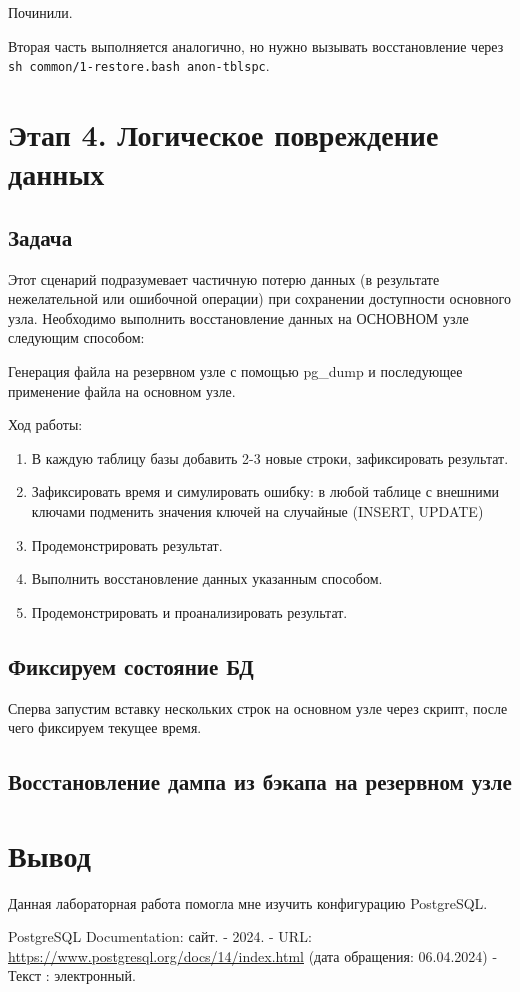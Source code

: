 \documentclass{article}
\begin{document}
Починили.

Вторая часть выполняется аналогично, но нужно вызывать восстановление через \texttt{sh common/1-restore.bash anon-tblspc}.

\section{Этап 4. Логическое повреждение данных}

\subsection{Задача}

Этот сценарий подразумевает частичную потерю данных (в результате нежелательной или ошибочной операции) при сохранении доступности основного узла. Необходимо выполнить восстановление данных на ОСНОВНОМ узле следующим способом:

Генерация файла на резервном узле с помощью pg\_dump и последующее применение файла на основном узле.

Ход работы:

\begin{enumerate}
    \item В каждую таблицу базы добавить 2-3 новые строки, зафиксировать результат.
    \item Зафиксировать время и симулировать ошибку: в любой таблице с внешними ключами подменить значения ключей на случайные (INSERT, UPDATE)
    \item Продемонстрировать результат.
    \item Выполнить восстановление данных указанным способом.
    \item Продемонстрировать и проанализировать результат.
\end{enumerate}

\subsection{Фиксируем состояние БД}

Сперва запустим вставку нескольких строк на основном узле через скрипт, после чего фиксируем текущее время.



\subsection{Восстановление дампа из бэкапа на резервном узле}

\section{Вывод}

Данная лабораторная работа помогла мне изучить конфигурацию PostgreSQL.

\begin{thebibliography}{99}
    PostgreSQL Documentation: сайт. - 2024.
    - URL: \url{https://www.postgresql.org/docs/14/index.html} (дата обращения: 06.04.2024) - Текст : электронный.
\end{thebibliography}
\end{document}
